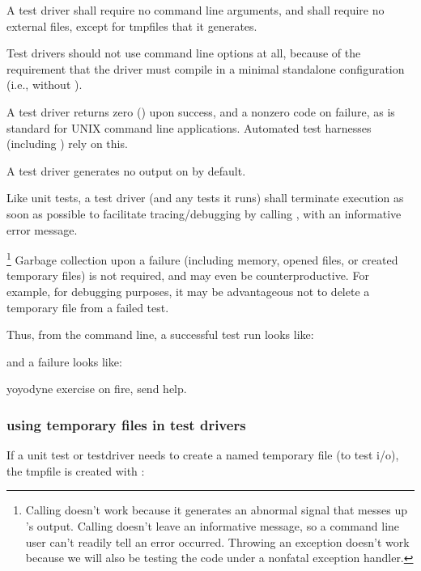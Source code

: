 A test driver shall require no command line arguments, and shall
require no external files, except for tmpfiles that it generates.

Test drivers should not use command line options at all, because of
the requirement that the driver must compile in a minimal standalone
configuration (i.e., without ). 

A test driver returns zero () upon success, and a nonzero
code on failure, as is standard for UNIX command line
applications. Automated test harnesses (including ) rely on
this.

A test driver generates no output on  by default. 

Like unit tests, a test driver (and any tests it runs) shall terminate
execution as soon as possible to facilitate tracing/debugging by
calling , with an informative error message. 

\footnote{Calling  doesn't work because it generates an
abnormal signal that messes up 's output. Calling
 doesn't leave an informative message, so a command
line user can't readily tell an error occurred.  Throwing an exception
doesn't work because we will also be testing the code under a nonfatal
exception handler.}  Garbage collection upon a failure (including
memory, opened files, or created temporary files) is not required, and
may even be counterproductive.  For example, for debugging purposes,
it may be advantageous not to delete a temporary file from a failed
test.

Thus, from the command line, a successful test run looks like:

\begin{cchunk}
\end{cchunk}

and a failure looks like:

\begin{cchunk}
      yoyodyne exercise on fire, send help.
\end{cchunk}




\subsubsection{using temporary files in test drivers}

If a unit test or testdriver needs to create a named temporary file
(to test i/o), the tmpfile is created with
:

